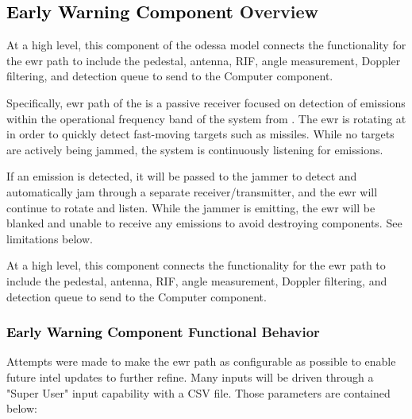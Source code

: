 \renewcommand\componentname{\textcolor{black}{\textbf{Early Warning Component }}}

\subsection{\unclass \componentname Overview}
\classlabelshort At a high level, this component of the \gls{odessa} model connects the functionality for the \gls{ewr} path to include the pedestal, antenna, RIF, angle measurement, Doppler filtering, and detection queue to send to the \modelname Computer component.

\classlabelshort Specifically, \gls{ewr} path of the \modelname is a passive receiver focused on detection of emissions within the operational frequency band of the system from \frequency. The \gls{ewr} is rotating at \EwrRotationRateRpm in order to quickly detect fast-moving targets such as missiles. While no targets are actively being jammed, the system is continuously listening for emissions.

\unclass If an emission is detected, it will be passed to the jammer to detect and automatically jam through a separate receiver/transmitter, and the \gls{ewr} will continue to rotate and listen. While the jammer is emitting, the \gls{ewr} will be blanked and unable to receive any emissions to avoid destroying components. See limitations below.

\unclass At a high level, this component connects the functionality for the \gls{ewr} path to include the pedestal, antenna, RIF, angle measurement, Doppler filtering, and detection queue to send to the Computer component.

\subsubsection{\unclass \componentname Functional Behavior}
\unclass Attempts were made to make the \gls{ewr} path as configurable as possible to enable future intel updates to further refine. Many inputs will be driven through a "Super User" input capability with a CSV file. Those parameters are contained below:

